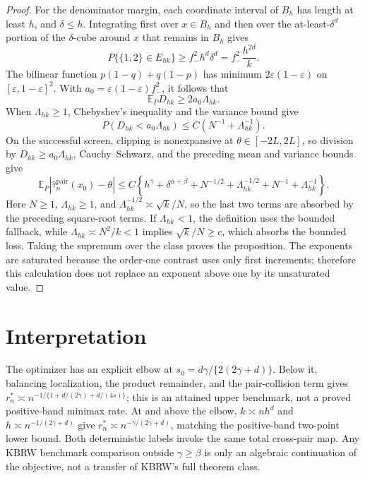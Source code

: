 \documentclass{article}
\begin{document}
\begin{proof}
For the denominator margin, each coordinate interval of \(B_h\) has length at least \(h\), and \(\delta\leq h\).  Integrating first over \(x\in B_h\) and then over the at-least-\(\delta^d\) portion of the \(\delta\)-cube around \(x\) that remains in \(B_h\) gives
\[
 P\{\{1,2\}\in E_{hk}\}\geq f_-^2h^d\delta^d=f_-^2\frac{h^{2d}}{k}.
\]
The bilinear function \(p(1-q)+q(1-p)\) has minimum \(2\varepsilon(1-\varepsilon)\) on \([\varepsilon,1-\varepsilon]^2\).  With \(a_0=\varepsilon(1-\varepsilon)f_-^2\), it follows that
\[
 \mathbb E_PD_{hk}\geq2a_0\Lambda_{hk}.
\]
When \(\Lambda_{hk}\geq1\), Chebyshev's inequality and the variance bound give
\[
 P(D_{hk}<a_0\Lambda_{hk})
 \leq C\left(N^{-1}+\Lambda_{hk}^{-1}\right).
\]
On the successful screen, clipping is nonexpansive at \(\theta\in[-2L,2L]\), so division by \(D_{hk}\geq a_0\Lambda_{hk}\), Cauchy--Schwarz, and the preceding mean and variance bounds give
\[
 \mathbb E_P|\widehat\tau_n^{\mathrm{pair}}(x_0)-\theta|
 \leq C\left\{h^{\bar\gamma}+\delta^{\bar\alpha+\bar\beta}
 +N^{-1/2}+\Lambda_{hk}^{-1/2}
 +N^{-1}+\Lambda_{hk}^{-1}\right\}.
\]
Here \(N\geq1\), \(\Lambda_{hk}\geq1\), and \(\Lambda_{hk}^{-1/2}\asymp\sqrt{k}/N\), so the last two terms are absorbed by the preceding square-root terms.  If \(\Lambda_{hk}<1\), the definition uses the bounded fallback, while \(\Lambda_{hk}\asymp N^2/k<1\) implies \(\sqrt{k}/N\geq c\), which absorbs the bounded loss.  Taking the supremum over the class proves the proposition.  The exponents are saturated because the order-one contrast uses only first increments; therefore this calculation does not replace an exponent above one by its unsaturated value.
\end{proof}

\section{Interpretation}

The optimizer has an explicit elbow at \(s_0=d\gamma/\{2(2\gamma+d)\}\).  Below it, balancing localization, the product remainder, and the pair-collision term gives \(r_n^*\asymp n^{-1/\{1+d/(2\gamma)+d/(4s)\}}\); this is an attained upper benchmark, not a proved positive-band minimax rate.  At and above the elbow, \(k\asymp nh^d\) and \(h\asymp n^{-1/(2\gamma+d)}\) give \(r_n^*\asymp n^{-\gamma/(2\gamma+d)}\), matching the positive-band two-point lower bound.  Both deterministic labels invoke the same total cross-pair map.  Any KBRW benchmark comparison outside \(\gamma\geq\beta\) is only an algebraic continuation of the objective, not a transfer of KBRW's full theorem class.
\end{document}

